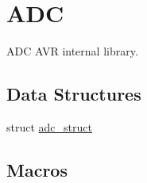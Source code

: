 \hypertarget{group__ex4__adc}{\section{A\-D\-C}
\label{group__ex4__adc}
}


A\-D\-C A\-V\-R internal library.  


\subsection*{Data Structures}
\begin{DoxyCompactItemize}
\item 
struct \hyperlink{structadc__struct}{adc\-\_\-struct}
\end{DoxyCompactItemize}
\subsection*{Macros}

